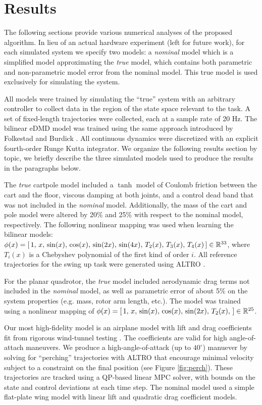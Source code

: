 \documentclass{article}
\begin{document}
\section{Results} \label{sec:results}

The following sections provide various numerical analyses of the proposed algorithm.  In
lieu of an actual hardware experiment (left for future work), for each simulated system we
specify two models: a \textit{nominal} model which is a simplified model approximating the
\textit{true} model, which contains both parametric and non-parametric model error from
the nominal model. This true model is used exclusively for simulating the system.

All models were trained by simulating the ``true'' system with an arbitrary controller to 
collect data in the region of the state space relevant to the task. A set of fixed-length 
trajectories were collected, each at a sample rate of 20 Hz. The bilinear eDMD model was
trained using the same approach introduced by Folkestad and Burdick \cite{Folkestad2021}.
All continuous dynamics were discretized with an explicit
fourth-order Runge Kutta integrator. 
We organize the following results section by topic, we briefly describe the three simulated
models used to produce the results in the paragraphs below.

The \textit{true} cartpole model included a $\tanh$ model of Coulomb friction between
the cart and the floor, viscous damping at both joints, and a control dead band that was not
included in the \textit{nominal} model. Additionally, the mass of the cart and pole model
were altered by 20\% and 25\% with respect to the nominal model, respectively.  The
following nonlinear mapping was used when learning the bilinear models: 
$\phi(x) = [\, 1,\,
x,\, \sin(x),\, \cos(x),\, \sin(2x),\, \sin(4x),\, T_2(x),\, T_3(x),\, T_4(x)\, ] \in
\mathbb{R}^{33}$, where $T_i(x)$ is a Chebyshev polynomial of the first kind of order $i$. 
All reference trajectories for the swing up task were generated using ALTRO 
\cite{Howell2019,Jackson2021}.

 For the planar quadrotor, the \textit{true} model
included aerodynamic drag terms not included in the \textit{nominal} model, as well as
parametric error of about 5\% on the system properties (e.g. mass, rotor arm length, etc.).
The model was trained using a nonlinear mapping of $\phi(x) = [\, 1,\, x,\, \sin(x),\,
\cos(x),\, \sin(2x),\, T_2(x),\, ] \in \mathbb{R}^{25}$. 

Our most high-fidelity model is an airplane model with lift and drag coefficients fit from
rigorous wind-tunnel testing \cite{Manchester2017}. The coefficients are valid for high
angle-of-attach maneuvers. We produce a high-angle-of-attack (up to $40^\circ$) manuever by
solving for ``perching'' trajectories with ALTRO that encourage minimal velocity subject to
a constraint on the final position (see Figure \ref{fig:perch}). These trajectories are
tracked using a QP-based linear MPC solver, with bounds on the state and control deviations
at each time step. The nominal model used a simple flat-plate wing model with linear lift
and quadratic drag coefficient models.
\end{document}
